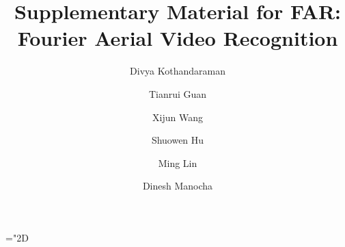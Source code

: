 \documentclass[runningheads]{llncs}
\begin{document}
\newcommand{\bigO}[1]{\mathcal{O}(#1)}
\newcommand{\sota}{state-of-the-art}
\newcommand{\tian}[1]{\textcolor{orange}{#1}}
\newcommand{\divya}[1]{\textcolor{blue}{#1}}
\newcommand{\model}{FAR}
\newcommand{\datanames}{Sub-$k$ matrices}
\newcommand{\G}{$G$}
\newcommand{\V}{$V$}
\newcommand{\E}{$E$}
\newcommand{\brr}[1]{\left( #1 \right)}
\newcommand{\bcc}[1]{ \left{ #1 \right} }
\newcommand{\bss}[1]{\left[ #1 \right]}
\newcommand{\mc}[1]{\mathcal{#1}}
\newcommand{\sg}{\mathcal{L}}
\newcommand{\li}{\sg}
\newcommand{\vts}[1]{\lvert #1 \rvert}
\newcommand{\Vts}[1]{\lVert #1 \rVert}
\newcommand{\bb}[1]{\mathbb{#1}}
\newcommand\inv[1]{#1\raisebox{1.05ex}{$\scriptscriptstyle-\!1$}}
\newcommand\Tstrut{\rule{0pt}{2.6ex}}         \newcommand\Bstrut{\rule[-1.3ex]{0pt}{0pt}}   \newcommand\Bstrutfrac{\rule[-0.7ex]{0pt}{0pt}}   \newcommand\Tstrutfrac{\rule{0pt}{1.7ex}}         \newcommand\mathdash{\text{\normalfont --}}
\newcommand{\cost}{\bigO{ \vts{\li^{\scriptscriptstyle -1}_t}k }}
\newcommand{\cm}{\mathcal{M}_{\Delta t}(u)}
\newcommand{\pc}{\zeta_c(t)}
\newcommand{\pd}{\zeta_d(t)}
\newcommand{\pe}{\zeta_e(t)}
\newcommand{\costk}{\bigO{ \vts{\li^{\scriptscriptstyle -1}_t} }}
\newcommand\setrow[1]{\gdef\rowmac{#1}#1\ignorespaces}
\makeatletter
\newcommand\footnoteref[1]{\protected@xdef\@thefnmark{\ref{#1}}\@footnotemark}
\makeatother
\newcommand{\size}{\bigO{d}}
\newcommand{\shorteq}{\settowidth{\@tempdima}{-}\resizebox{\@tempdima}{\height}{=}}
\newcommand*\midpoint[1]{\overline{#1}}
\newcommand{\mysetminus}{\mathbin{\fgebackslash}}



\let\proof\relax
\let\endproof\relax

\linespread{0.97}
\setlength{\parskip}{-0.1em}
\mathchardef\mhyphen="2D

\newcommand{\minus}{\scalebox{0.75}[1.0]{$-$}} 
\pagestyle{headings}
\mainmatter
\def\ECCVSubNumber{4270}  

\title{Supplementary Material for FAR: Fourier Aerial Video Recognition}

\begin{comment}
\titlerunning{ECCV-22 submission ID \ECCVSubNumber} 
\authorrunning{ECCV-22 submission ID \ECCVSubNumber} 
\author{Anonymous ECCV submission}
\institute{Paper ID \ECCVSubNumber}
\end{comment}


\author{Divya Kothandaraman \and
Tianrui Guan \and
Xijun Wang \and
Shuowen Hu \and
Ming Lin \and
Dinesh Manocha}
\maketitle
\end{document}
